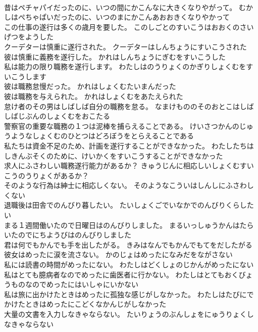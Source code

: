 \documentclass[8pt]{extreport}
\begin{document}
\begin{CJK}{UTF8}{min}
\\	昔はペチャパイだったのに、いつの間にかこんなに大きくなりやがって。	むかしはぺちゃぱいだったのに、いつのまにかこんあおおきくなりやかって 
\\	この仕事の遂行は多くの歳月を要した。	このしごとのすいこうはおおくのさいげつをようした 
\\	クーデターは慎重に遂行された。	クーデターはしんちょうにすいこうされた 
\\	彼は慎重に義務を遂行した。	かれはしんちょうにぎむをすいこうした 
\\	私は能力の限り職務を遂行します。	わたしはのうりょくのかぎりしょくむをすいこうします 
\\	彼は職務怠慢だった。	かれはしょくむたいまんだった 
\\	彼は職務を与えられた。	かれはしょくむをあたえられた 
\\	怠け者のその男はしばしば自分の職務を怠る。	なまけもののそのおとこはしばしばじぶんのしょくむをおこたる 
\\	警察官の重要な職務の１つは泥棒を捕らえることである。	けいさつかんのじゅうようなしょくむのひとつはどろぼうをとらえることである 
\\	私たちは資金不足のため、計画を遂行することができなかった。	わたしたちはしきんぶそくのために、けいかくをすいこうすることができなかった 
\\	求人にふさわしい職務遂行能力があるか？	きゅうじんに相応しいしょくむすいこうのうりょくがあるか？ 
\\	そのような行為は紳士に相応しくない。	そのようなこういはしんしにふさわしくない 
\\	退職後は田舎でのんびり暮したい。	たいしょくごでいなかでのんびりくらしたい 
\\	まる１週間働いたので日曜日はのんびりしました。	まるいっしゅうかんはたらいたのでにちようびはのんびりしました 
\\	君は何でもかんでも手を出したがる。	きみはなんでもかんでもてをだしたがる 
\\	彼女はめったに涙を流さない。	かのじょはめったになみだをながさない 
\\	私には読書の時間がめったにない。	わたしはどくしょのじかんがめったにない 
\\	私はとても臆病者なのでめったに歯医者に行かない。	わたしはとてもおくびょうものなのでめったにはいしゃにいかない 
\\	私は旅に出かけたときはめったに孤独な感じがしなかった。	わたしはたびにでかけたときはめったにこどくなかんじがしなかった 
\\	大量の文書を入力しなきゃならない。	たいりょうのぶんしょをにゅうりょくしなきゃならない 

\end{CJK}
\end{document}
